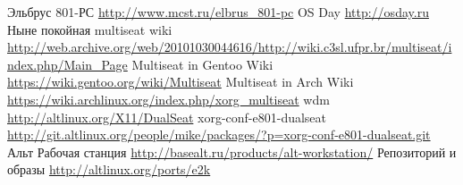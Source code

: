 \documentclass[10pt, a5paper]{article}
\begin{document}
\begin{thebibliography}{20}

 Эльбрус 801-РС \url{http://www.mcst.ru/elbrus_801-pc}
 OS Day \url{http://osday.ru}
 Ныне покойная multiseat wiki \url{http://web.archive.org/web/20101030044616/http://wiki.c3sl.ufpr.br/multiseat/index.php/Main_Page}
 Multiseat in Gentoo Wiki \url{https://wiki.gentoo.org/wiki/Multiseat}
 Multiseat in Arch Wiki \url{https://wiki.archlinux.org/index.php/xorg_multiseat}
 wdm \url{http://altlinux.org/X11/DualSeat}
 xorg-conf-e801-dualseat \url{http://git.altlinux.org/people/mike/packages/?p=xorg-conf-e801-dualseat.git}
 Альт Рабочая станция \url{http://basealt.ru/products/alt-workstation/}
 Репозиторий и образы \url{http://altlinux.org/ports/e2k}
\end{thebibliography}
\end{document}
